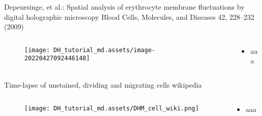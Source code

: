 \documentclass[t, aspectratio=169]{beamer}
\begin{document}
\begin{frame}{Depeursinge, et al.: Spatial analysis of erythrocyte membrane fluctuations by digital holographic microscopy}
	\vspace{-3 mm}
	\small Blood Cells, Molecules, and Diseases 42, 228–232 (2009)
	\begin{columns}
		\begin{column}{.6\textwidth}
			\begin{figure}
				\texttt{[image: DH\_tutorial\_md.assets/image-20220427092446148]}
			\end{figure}
		\end{column}
		\begin{column}{.4\textwidth}
			\begin{itemize}
				\item aaa
			\end{itemize}
		\end{column}
	\end{columns}
\end{frame}




\begin{frame}{Time-lapse of unstained, dividing and migrating cells}
	\vspace{-3 mm}
	\small wikipedia
	\begin{columns}
		\begin{column}{.6\textwidth}
			\begin{figure}
				\texttt{[image: DH\_tutorial\_md.assets/DHM\_cell\_wiki.png]}
			\end{figure}
		\end{column}
		\begin{column}{.4\textwidth}
			\begin{itemize}
				\item aaa
			\end{itemize}
		\end{column}
	\end{columns}
\end{frame}
\end{document}
